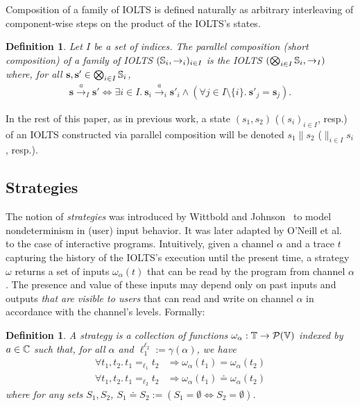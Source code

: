 \documentclass[preprint,5p,twocolumn]{elsarticle}
\newtheorem{definition}[theorem]{Definition}
\begin{document}
Composition of a family of IOLTS is defined naturally as arbitrary interleaving of component-wise
steps on the product of the IOLTS's states.

\begin{definition}
  Let $I$ be a set of indices. The \emph{parallel composition} (short \emph{composition}) of a family of IOLTS $(\mathbb{S}_i,\rightarrow_i)_{i \in I}$ is the IOLTS $(\bigotimes_{i \in I} \mathbb{S}_i, \rightarrow_I)$ where, for all $\mathbf{s},\mathbf{s'} \in\bigotimes_{i \in I} \mathbb{S}_i$,
  \begin{align*}
\mathbf{s} \xrightarrow{a}_I \mathbf{s'} \Longleftrightarrow \exists i \in I.~\mathbf{s}_i \xrightarrow{a}_i \mathbf{s'}_i \land (\forall j \in I \setminus \{i\}.~\mathbf{s'}_j=\mathbf{s}_j).
  \end{align*}
\end{definition}

In the rest of this paper, as in previous work,
a state $(s_1,s_2)$ ($(s_i)_{i \in I}$, resp.) of an IOLTS constructed
via parallel composition will be denoted $s_1 \parallel s_2$ ($\parallel_{i \in I} s_i$, resp.).

\subsection{Strategies}

The notion of \emph{strategies} was introduced by Wittbold and Johnson~\cite{Wittbold1990}
to model nondeterminism in (user) input behavior. It was later adapted by O'Neill et
al.~\cite{ONeill2006} to the case of interactive programs. Intuitively, given a channel $\alpha$
and a trace $t$ capturing the history of the IOLTS's execution until the present time, a strategy
$\omega$ returns a set of inputs $\omega_\alpha(t)$ that can be read by the program from channel $\alpha$. The presence and value of these inputs may depend only
on past inputs and outputs \emph{that are visible to users} that can read and write on channel
$\alpha$ in accordance with the channel's levels. Formally:


\begin{definition}
  A \emph{strategy} is a collection of functions $\omega_\alpha: \mathbb{T} \rightarrow \mathcal{P}(\mathbb{V})$ indexed by $a \in \mathbb{C}$ such that, for all $\alpha$ and $\ell_1^{\ell_2} := \gamma(\alpha)$, we have
  \begin{align*}
    \forall t_1, t_2.\, t_1 =_{\ell_1} t_2 &\Longrightarrow \omega_\alpha(t_1) = \omega_\alpha(t_2)\\
    \forall t_1, t_2.\, t_1 =_{\ell_2} t_2 &\Longrightarrow \omega_\alpha(t_1) \doteq \omega_\alpha(t_2)
  \end{align*}
  where for any sets $S_1,S_2$, $S_1 \doteq S_2 := (S_1 = \emptyset \Leftrightarrow S_2 = \emptyset)$. 
\end{definition}
\end{document}
